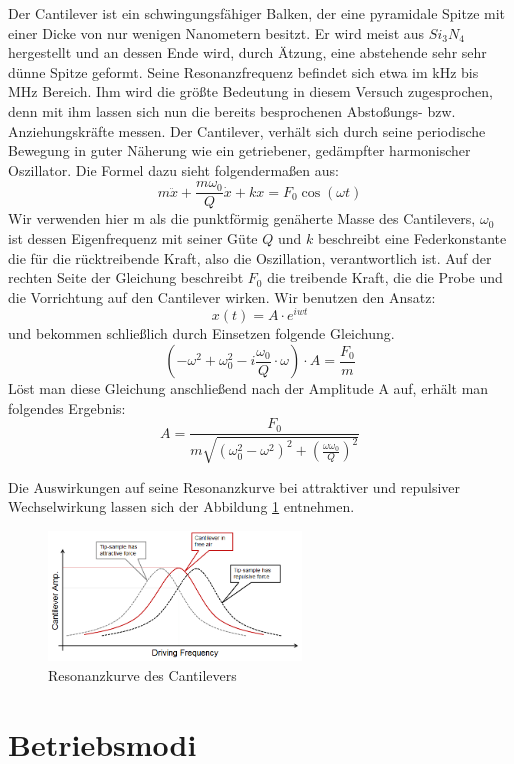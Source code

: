  
Der Cantilever ist ein schwingungsfähiger Balken, der eine pyramidale Spitze mit einer Dicke von nur wenigen Nanometern besitzt.
Er wird meist aus $Si_3N_4$ hergestellt und an dessen Ende wird, durch Ätzung, eine abstehende sehr sehr dünne Spitze geformt.
Seine Resonanzfrequenz befindet sich etwa im kHz bis MHz Bereich.
Ihm wird die größte Bedeutung in diesem Versuch zugesprochen, denn mit ihm lassen sich nun die bereits besprochenen Abstoßungs- bzw. Anziehungskräfte messen.
Der Cantilever, verhält sich durch seine periodische Bewegung in guter Näherung wie ein getriebener, gedämpfter harmonischer Oszillator. 
Die Formel dazu sieht folgendermaßen aus:
\[
    m \ddot{x} + \frac{m \omega_0}{Q} \dot{x} + kx = F_0 \cos(\omega t)
\]
Wir verwenden hier m als die punktförmig genäherte Masse des Cantilevers, $\omega_0$ ist dessen Eigenfrequenz mit seiner Güte $Q$ und $k$ beschreibt eine Federkonstante die für die rücktreibende Kraft, also die Oszillation, verantwortlich ist.
Auf der rechten Seite der Gleichung beschreibt $F_0$ die treibende Kraft, die die Probe und die Vorrichtung auf den Cantilever wirken.
Wir benutzen den Ansatz:
\[
    x(t)=A \cdot e^{iwt}
\]
und bekommen schließlich durch Einsetzen folgende Gleichung.
\[
   \left(-\omega^2+\omega_0^2-i\frac{\omega_0}{Q} \cdot \omega \right) \cdot A 
   = \frac{F_0}{m}
\]
Löst man diese Gleichung anschließend nach der Amplitude A auf, erhält man 
folgendes Ergebnis:
\[
    A = \frac{F_0}{m \sqrt{ ( \omega_0^2 - \omega^2 )^2 + \left( \frac{\omega 
        \omega_0}{Q} \right)^2}}
\]

Die Auswirkungen auf seine Resonanzkurve bei attraktiver und repulsiver Wechselwirkung lassen sich der Abbildung \ref{vorb_sweep} entnehmen.

\begin{figure}[h!]
    \centering
    \includegraphics[width=0.6\textwidth]{Abb/freqsweep.png}
    \caption{Resonanzkurve des Cantilevers}
    \label{vorb_sweep}
\end{figure}



\section{Betriebsmodi}



